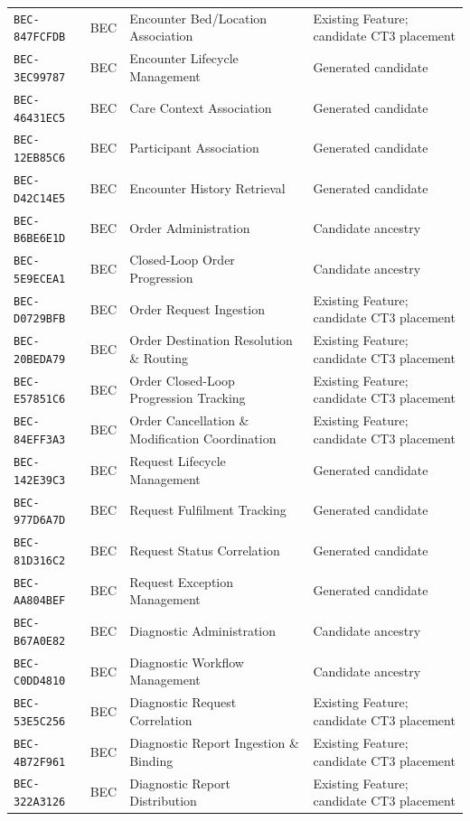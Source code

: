 \documentclass[11pt,a4paper,openany]{book}
\begin{document}
\begin{longtable}{@{}p{.19\linewidth}p{.12\linewidth}p{.39\linewidth}p{.24\linewidth}@{}}
\texttt{BEC-847FCFDB} & BEC & Encounter Bed/Location Association & Existing Feature; candidate CT3 placement \\
\texttt{BEC-3EC99787} & BEC & Encounter Lifecycle Management & Generated candidate \\
\texttt{BEC-46431EC5} & BEC & Care Context Association & Generated candidate \\
\texttt{BEC-12EB85C6} & BEC & Participant Association & Generated candidate \\
\texttt{BEC-D42C14E5} & BEC & Encounter History Retrieval & Generated candidate \\
\texttt{BEC-B6BE6E1D} & BEC & Order Administration & Candidate ancestry \\
\texttt{BEC-5E9ECEA1} & BEC & Closed-Loop Order Progression & Candidate ancestry \\
\texttt{BEC-D0729BFB} & BEC & Order Request Ingestion & Existing Feature; candidate CT3 placement \\
\texttt{BEC-20BEDA79} & BEC & Order Destination Resolution \& Routing & Existing Feature; candidate CT3 placement \\
\texttt{BEC-E57851C6} & BEC & Order Closed-Loop Progression Tracking & Existing Feature; candidate CT3 placement \\
\texttt{BEC-84EFF3A3} & BEC & Order Cancellation \& Modification Coordination & Existing Feature; candidate CT3 placement \\
\texttt{BEC-142E39C3} & BEC & Request Lifecycle Management & Generated candidate \\
\texttt{BEC-977D6A7D} & BEC & Request Fulfilment Tracking & Generated candidate \\
\texttt{BEC-81D316C2} & BEC & Request Status Correlation & Generated candidate \\
\texttt{BEC-AA804BEF} & BEC & Request Exception Management & Generated candidate \\
\texttt{BEC-B67A0E82} & BEC & Diagnostic Administration & Candidate ancestry \\
\texttt{BEC-C0DD4810} & BEC & Diagnostic Workflow Management & Candidate ancestry \\
\texttt{BEC-53E5C256} & BEC & Diagnostic Request Correlation & Existing Feature; candidate CT3 placement \\
\texttt{BEC-4B72F961} & BEC & Diagnostic Report Ingestion \& Binding & Existing Feature; candidate CT3 placement \\
\texttt{BEC-322A3126} & BEC & Diagnostic Report Distribution & Existing Feature; candidate CT3 placement \\

\end{longtable}
\end{document}
